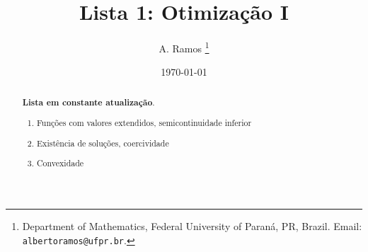 \documentclass[a4paper,latin]{article}
\begin{document}
\title{Lista 1: Otimização I }

\author{
A. Ramos \thanks{Department of Mathematics,
    Federal University of Paraná, PR, Brazil.
    Email: {\tt albertoramos@ufpr.br}.}
}

\date{\today}
 
\maketitle

\begin{abstract}
{\bf Lista em constante atualização}.
 \begin{enumerate}
 \item Funções com valores extendidos, semicontinuidade inferior 
 \item Existência de soluções, coercividade
 \item Convexidade 
 \end{enumerate}
\end{abstract}
\end{document}
